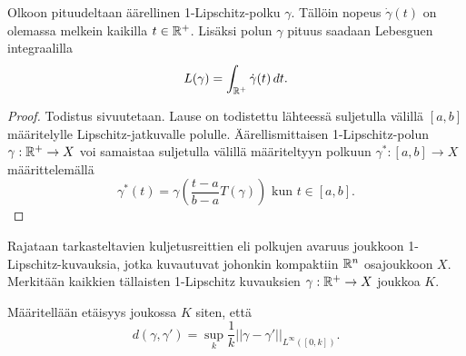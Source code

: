 \documentclass[12pt,oneside,a4paper]{amsbook} %
\begin{document}
\begin{theorem}
    Olkoon pituudeltaan äärellinen 1-Lipschitz-polku $\gamma$. Tällöin nopeus $\dot \gamma(t)$ on olemassa melkein kaikilla $t \in {\mathbb{R}^{+}}$. Lisäksi polun $\gamma$ pituus saadaan Lebesguen integraalilla
    \begin{equation*}
        L(\gamma) = \int_{\mathbb{R}^{+}} \dot \gamma(t) \, dt.
    \end{equation*}
\end{theorem}
\begin{proof}
    Todistus sivuutetaan. Lause on todistettu lähteessä \cite[s.57] {burago} suljetulla välillä $[a, b]$ määritelylle Lipschitz-jatkuvalle polulle. Äärellismittaisen 1-Lipschitz-polun $\gamma:{\mathbb{R}^{+}} \to X$ voi samaistaa suljetulla välillä määriteltyyn polkuun $\gamma^*:[a,b] \to X$ määrittelemällä 
    \begin{equation*}
        \gamma^*(t) =  \gamma\left(\frac{t-a}{b-a}T(\gamma)\right) \text{ kun } t \in [a, b].
    \end{equation*}
\end{proof}


Rajataan tarkasteltavien kuljetusreittien eli polkujen avaruus
joukkoon 1-Lipschitz-kuvauksia, jotka kuvautuvat johonkin kompaktiin $\mathbb{R}^n$ osajoukkoon $X$. Merkitään kaikkien tällaisten 1-Lipschitz kuvauksien $\gamma: {\mathbb{R}^{+}} \to X$  joukkoa $K$. 

\begin{definition}
    Määritellään etäisyys joukossa $K$ siten, että
    \[d(\gamma, \gamma') = \sup_k \frac{1}{k}||\gamma - \gamma'||_{L^\infty([0,k])}.\]
\end{definition}
\end{document}
